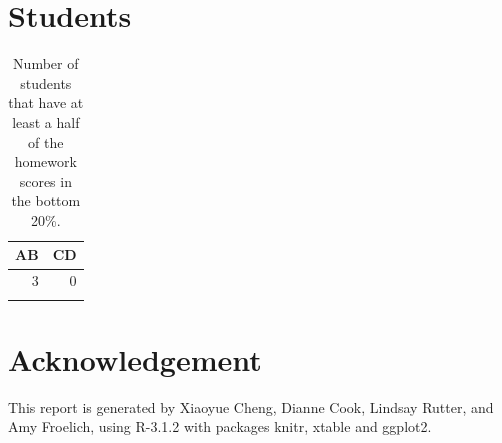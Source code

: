\documentclass[12pt,nohyper]{tufte-handout}\usepackage[]{graphicx}\usepackage[]{color}
\begin{document}
\clearpage
\section{Students}

\begin{longtable}{rr}
  \hline
AB & CD \\ 
  \hline
  3 &   0 \\ 
   \hline
\hline
\caption{Number of students that have at least a half of the homework scores in the bottom 20\%.} 
\label{tab:bottom20}
\end{longtable}



\clearpage
\newpage{}
\section{Acknowledgement}
This report is generated by Xiaoyue Cheng, Dianne Cook, Lindsay Rutter, and Amy Froelich, using R-3.1.2 with packages knitr, xtable and ggplot2.
\end{document}
